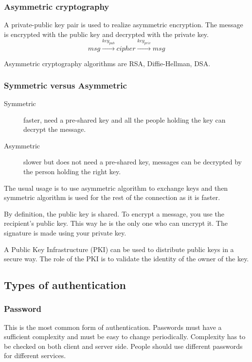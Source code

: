 \subsubsection{Asymmetric cryptography}
A private-public key pair is used to realize asymmetric encryption. The
message is encrypted with the public key and decrypted with the private key.
\[ msg \xrightarrow{key_{pub}} cipher \xrightarrow{key_{priv}} msg \]

Asymmetric cryptography algorithms are RSA, Diffie-Hellman, DSA.

\subsubsection{Symmetric versus Asymmetric}

\begin{description}
\item[Symmetric]
faster, need a pre-shared key and all the people holding the key can
decrypt the message.
\item[Asymmetric]
slower but does not need a pre-shared key, messages can be decrypted by the
person holding the right key.
\end{description}

The usual usage is to use asymmetric algorithm to exchange keys and then
symmetric algorithm is used for the rest of the connection as it is faster.

By definition, the public key is shared.
To encrypt a message, you use the recipient's public key. This way he is the
only one who can uncrypt it. The signature is made using your private key.

A Public Key Infrastructure (PKI) can be used to distribute public keys in a
secure way. The role of the PKI is to validate the identity of the owner of
the key.

\subsection{Types of authentication}

\subsubsection{Password}
This is the most common form of authentication.
Passwords must have a sufficient complexity and must be easy to change
periodically.
Complexity has to be checked on both client and server side.
People should use different passwords for different services.

